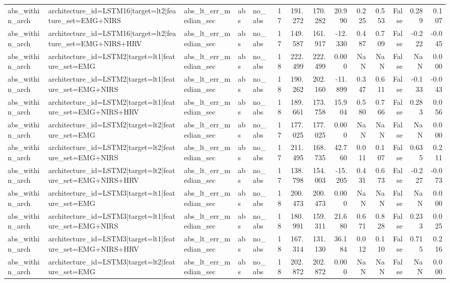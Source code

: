 \begin{table}
\begin{tabular}{lllllrrrrrrrrr}
abs_within_arch & architecture_id=LSTM16|target=lt2|feature_set=EMG+NIRS & abs_lt_err_median_sec & abs & no_abs & 17 & 191.272 & 170.282 & 20.990 & 0.225 & 0.553 & False & 0.289 & 0.107 \\
abs_within_arch & architecture_id=LSTM16|target=lt2|feature_set=EMG+NIRS+HRV & abs_lt_err_median_sec & abs & no_abs & 17 & 149.587 & 161.917 & -12.330 & 0.487 & 0.709 & False & -0.222 & -0.045 \\
abs_within_arch & architecture_id=LSTM2|target=lt1|feature_set=EMG & abs_lt_err_median_sec & abs & no_abs & 18 & 222.499 & 222.499 & 0.000 & NaN & NaN & False & NaN & 0.000 \\
abs_within_arch & architecture_id=LSTM2|target=lt1|feature_set=EMG+NIRS & abs_lt_err_median_sec & abs & no_abs & 18 & 190.262 & 202.160 & -11.899 & 0.347 & 0.611 & False & -0.133 & -0.043 \\
abs_within_arch & architecture_id=LSTM2|target=lt1|feature_set=EMG+NIRS+HRV & abs_lt_err_median_sec & abs & no_abs & 18 & 189.661 & 173.758 & 15.904 & 0.580 & 0.766 & False & 0.283 & 0.056 \\
abs_within_arch & architecture_id=LSTM2|target=lt2|feature_set=EMG & abs_lt_err_median_sec & abs & no_abs & 17 & 177.025 & 177.025 & 0.000 & NaN & NaN & False & NaN & 0.000 \\
abs_within_arch & architecture_id=LSTM2|target=lt2|feature_set=EMG+NIRS & abs_lt_err_median_sec & abs & no_abs & 17 & 211.495 & 168.735 & 42.760 & 0.011 & 0.107 & False & 0.635 & 0.211 \\
abs_within_arch & architecture_id=LSTM2|target=lt2|feature_set=EMG+NIRS+HRV & abs_lt_err_median_sec & abs & no_abs & 17 & 138.798 & 154.003 & -15.205 & 0.431 & 0.673 & False & -0.227 & -0.073 \\
abs_within_arch & architecture_id=LSTM3|target=lt1|feature_set=EMG & abs_lt_err_median_sec & abs & no_abs & 18 & 200.473 & 200.473 & 0.000 & NaN & NaN & False & NaN & 0.000 \\
abs_within_arch & architecture_id=LSTM3|target=lt1|feature_set=EMG+NIRS & abs_lt_err_median_sec & abs & no_abs & 18 & 180.991 & 159.311 & 21.680 & 0.671 & 0.828 & False & 0.233 & 0.025 \\
abs_within_arch & architecture_id=LSTM3|target=lt1|feature_set=EMG+NIRS+HRV & abs_lt_err_median_sec & abs & no_abs & 18 & 167.314 & 131.130 & 36.184 & 0.012 & 0.110 & False & 0.715 & 0.216 \\
abs_within_arch & architecture_id=LSTM3|target=lt2|feature_set=EMG & abs_lt_err_median_sec & abs & no_abs & 18 & 202.872 & 202.872 & 0.000 & NaN & NaN & False & NaN & 0.000 \\

\end{tabular}
\end{table}
